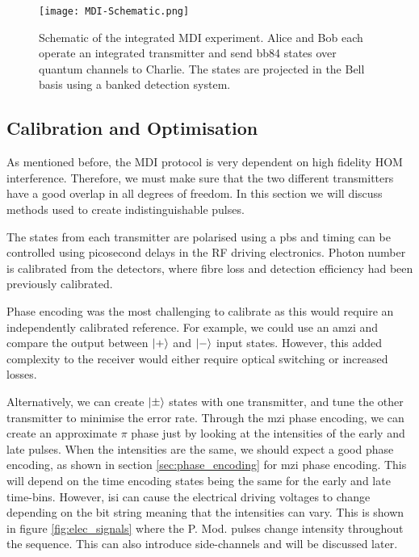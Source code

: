 \begin{figure}[t]
	\centering
	\texttt{[image: MDI-Schematic.png]}
	\caption[Chip-based MDI-QKD experimental schematic]{Schematic of the integrated \acs{MDI} experiment. Alice and Bob each operate an integrated transmitter and send \acs{bb84} states over quantum channels to Charlie. The states are projected in the Bell basis using a banked detection system.}
	\label{fig:mdi-schem}
\end{figure}

\subsection{Calibration and Optimisation}

As mentioned before, the \ac{MDI} protocol is very dependent on high fidelity \ac{HOM} interference. Therefore, we must make sure that the two different transmitters have a good overlap in all degrees of freedom. In this section we will discuss methods used to create indistinguishable pulses.

The states from each transmitter are polarised using a \ac{pbs} and timing can be controlled using picosecond delays in the RF driving electronics. Photon number is calibrated from the detectors, where fibre loss and detection efficiency had been previously calibrated. 

Phase encoding was the most challenging to calibrate as this would require an independently calibrated reference. For example, we could use an \ac{amzi} and compare the output between $\ket{+}$ and $\ket{-}$ input states. However, this added complexity to the receiver would either require optical switching or increased losses. 

Alternatively, we can create $\ket{\pm}$ states with one transmitter, and tune the other transmitter to minimise the error rate. Through the \ac{mzi} phase encoding, we can create an approximate $\pi$ phase just by looking at the intensities of the early and late pulses. When the intensities are the same, we should expect a good phase encoding, as shown in section \ref{sec:phase_encoding} for \ac{mzi} phase encoding. This will depend on the time encoding states being the same for the early and late time-bins. However, \ac{isi} can cause the electrical driving voltages to change depending on the bit string meaning that the intensities can vary. This is shown in figure \ref{fig:elec_signals} where the P. Mod. pulses change intensity throughout the sequence. This can also introduce side-channels and will be discussed later.

